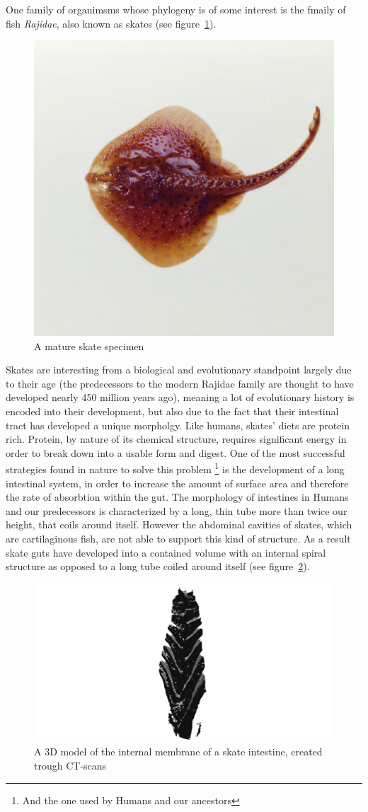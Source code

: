 \documentclass[condensed]{union-cs-thesis}
\begin{document}
\par
One family of organimsms whose phylogeny is of some interest is the fmaily of fish \emph{Rajidae}, also known as skates (see figure~\ref{fig:skatepic}).
\begin{figure}[h]
  \centering
  \includegraphics[width=.25\textwidth]{skate-pic}
  \caption{A mature skate specimen}
  \label{fig:skatepic}
\end{figure}
Skates are interesting from a biological and evolutionary standpoint largely due to their age (the predecessors to the modern Rajidae family are thought to have developed nearly 450 million years ago), meaning a lot of evolutionary history is encoded into their development, but also due to the fact that their intestinal tract has developed a unique morpholgy.  Like humans, skates' diets are protein rich.  Protein, by nature of its chemical structure, requires significant energy in order to break down into a usable form and digest.  One of the most successful strategies found in nature to solve this problem
\footnote{And the one used by Humans and our ancestors}
is the development of a long intestinal system, in order to increase the amount of surface area and therefore the rate of absorbtion within the gut.  The morphology of intestines in Humans and our predecessors is characterized by a long, thin tube more than twice our height, that coils around itself.  However the abdominal cavities of skates, which are cartilaginous fish, are not able to support this kind of structure.  As a result skate guts have developed into a contained volume with an internal spiral structure as opposed to a long tube coiled around itself (see figure~\ref{fig:gut_model}).
\begin{figure}[h]
  \centering
  \includegraphics[width=.66\textwidth]{model_img}
  \caption{A 3D model of the internal membrane of a skate intestine, created trough CT-scans}
  \label{fig:gut_model}
\end{figure}
\end{document}
